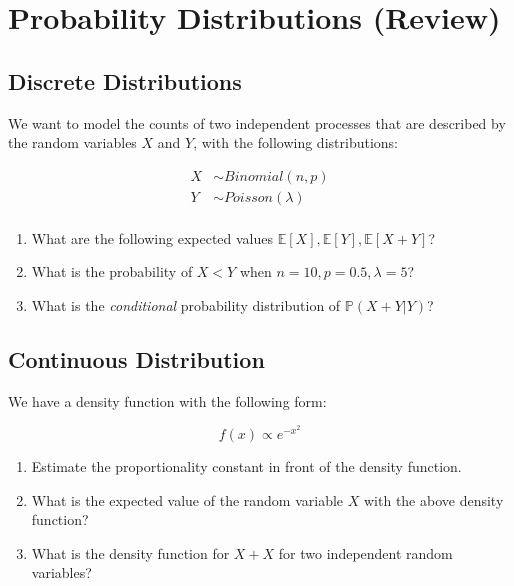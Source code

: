 \documentclass{pset}
\date{6/1/2025}
\begin{document}
\maketitle

\section*{Probability Distributions (Review)}


\subsection*{Discrete Distributions}

We want to model the counts of two independent processes that are described by the random variables $X$ and $Y$, with the following distributions: 

$$
\begin{aligned}
X &\sim Binomial(n,p)\\
Y &\sim Poisson(\lambda)\\ 
\end{aligned}
$$

\begin{enumerate}
\item What are the following expected values $\mathbb{E}[X], \mathbb{E}[Y], \mathbb{E}[X + Y]$?
\item What is the probability of $X < Y$ when $n=10, p=0.5, \lambda=5$? 
\item What is the \textit{conditional} probability distribution of $\mathbb{P}(X + Y | Y)$?
\end{enumerate}

\subsection*{Continuous Distribution}

We have a density function with the following form: 

$$f(x) \propto e^{-x^2}$$

\begin{enumerate}
\item Estimate the proportionality constant in front of the density function.
\item What is the expected value of the random variable $X$ with the above density function?
\item What is the density function for $X + X$ for two independent random variables?
\end{enumerate}
\end{document}

